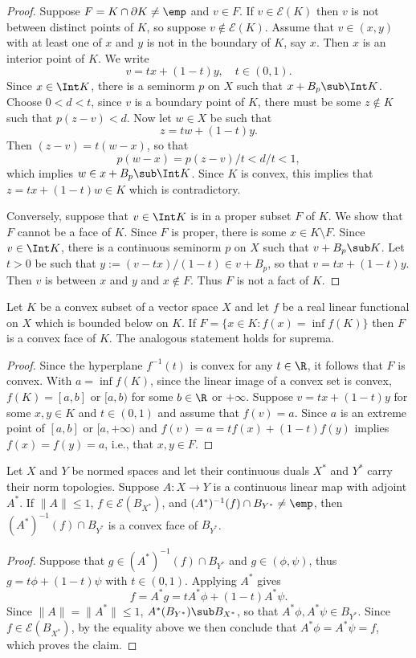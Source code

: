 \begin{proof}
Suppose $F=K\cap\partial K\neq\emp$ and $v\in F$. If $v\in\mathcal{E}(K)$ then $v$ is not between distinct points of $K$, so suppose $v\notin\mathcal{E}(K)$. Assume that $v\in(x,y)$ with at least one of $x$ and $y$ is not in the boundary of $K$, say $x$. Then $x$ is an interior point of $K$. We write
\[v=tx+(1-t)y,\quad t\in(0,1).\]
Since $x\in\Int K$, there is a seminorm $p$ on $X$ such that $x+B_p\sub\Int K$. Choose $0<d<t$, since $v$ is a boundary point of $K$, there must be some $z\notin K$ such that $p(z-v)<d$. Now let $w\in X$ be such that
\[z=tw+(1-t)y.\]
Then $(z-v)=t(w-x)$, so that
\[p(w-x)=p(z-v)/t<d/t<1,\]
which implies $w\in x+B_p\sub\Int K$. Since $K$ is convex, this implies that $z=tx+(1-t)w\in K$ which is contradictory.\par
Conversely, suppose that $v\in\Int K$ is in a proper subset $F$ of $K$. We show that $F$ cannot be a face of $K$. Since $F$ is proper, there is some $x\in K\setminus F$. Since $v\in\Int K$, there is a continuous seminorm $p$ on $X$ such that $v+B_p\sub K$. Let $t>0$ be such that $y:=(v-tx)/(1-t)\in v+B_p$, so that $v=tx+(1-t)y$. Then $v$ is between $x$ and $y$ and $x\notin F$. Thus $F$ is not a fact of $K$. 
\end{proof}
\begin{proposition}\label{TVS face induced by inf of functional}
Let $K$ be a convex subset of a vector space $X$ and let $f$ be a real linear functional on $X$ which is bounded below on $K$. If $F=\{x\in K:f(x)=\inf f(K)\}$ then $F$ is a convex face of $K$. The analogous statement holds for suprema.
\end{proposition}
\begin{proof}
Since the hyperplane $f^{-1}(t)$ is convex for any $t\in\R$, it follows that $F$ is convex. With $a=\inf f(K)$, since the linear image of a convex set is convex, $f(K)=[a,b]$ or $[a,b)$ for some $b\in\R$ or $+\infty$. Suppose $v=tx+(1-t)y$ for some $x,y\in K$ and $t\in(0,1)$ and assume that $f(v)=a$. Since $a$ is an extreme point of $[a,b]$ or $[a,+\infty)$ and $f(v)=a=tf(x)+(1-t)f(y)$ implies $f(x)=f(y)=a$, i.e., that $x,y\in F$.
\end{proof}
\begin{proposition}\label{NVS face induced by adjoint}
Let $X$ and $Y$ be normed spaces and let their continuous duals $X^*$ and $Y^*$ carry their norm topologies. Suppose $A:X\to Y$ is a continuous linear map with adjoint $A^*$. If $\|A\|\leq 1$, $f\in\mathcal{E}(B_{X^*})$, and $(A^*)^{-1}(f)\cap B_{Y^*}\neq\emp$, then $(A^*)^{-1}(f)\cap B_{Y^*}$ is a convex face of $B_{Y^*}$.
\end{proposition}
\begin{proof}
Suppose that $g\in(A^*)^{-1}(f)\cap B_{Y^*}$ and $g\in(\phi,\psi)$, thus $g=t\phi+(1-t)\psi$ with $t\in(0,1)$. Applying $A^*$ gives
\[f=A^*g=tA^*\phi+(1-t)A^*\psi.\]
Since $\|A\|=\|A^*\|\leq 1$, $A^*(B_{Y^*})\sub B_{X^*}$, so that $A^*\phi,A^*\psi\in B_{Y^*}$. Since $f\in\mathcal{E}(B_{X^*})$, by the equality above we then conclude that $A^*\phi=A^*\psi=f$, which proves the claim.
\end{proof}
